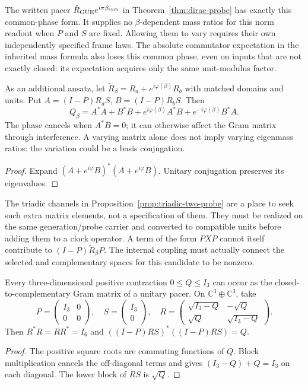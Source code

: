 The written pacer $\hat R_{\rm GUE}e^{i\pi\beta_{\mathrm{sym}}}$ in
Theorem~\ref{thm:dirac-probe} has exactly this common-phase form.
It supplies no $\beta$-dependent mass ratios for this norm readout
when $P$ and $S$ are fixed. Allowing them to vary requires their
own independently specified frame laws.
The absolute commutator expectation in the inherited mass formula
also loses this common phase, even on inputs that are not exactly
closed: its expectation acquires only the same unit-modulus factor.

\begin{proposition}
\label{v480:generation-relative-phase}
As an additional ansatz, let
$\widetilde R_\beta=R_a+e^{i\varphi(\beta)}R_b$ with matched
domains and units. Put $A=(I-P)R_aS$, $B=(I-P)R_bS$. Then
\[
 Q_\beta=A^*A+B^*B
       +e^{i\varphi(\beta)}A^*B
       +e^{-i\varphi(\beta)}B^*A.
\]
The phase cancels when $A^*B=0$; it can otherwise affect the Gram
matrix through interference. A varying matrix alone does not imply
varying eigenmass ratios: the variation could be a basis conjugation.
\end{proposition}
\begin{proof}
Expand $(A+e^{i\varphi}B)^*(A+e^{i\varphi}B)$.
Unitary conjugation preserves its eigenvalues.
\end{proof}

The triadic channels in Proposition~\ref{prop:triadic-two-probe}
are a place to seek such extra matrix elements, not a specification
of them. They must be realized on the same generation/probe carrier
and converted to compatible units before adding them to a clock
operator. A term of the form $PXP$ cannot itself contribute to
$(I-P)\widetilde R_\beta P$. The internal coupling must actually
connect the selected and complementary spaces for this candidate
to be nonzero.

\begin{proposition}
\label{v480:generation-unitary-dilation}
Every three-dimensional positive contraction $0\leq Q\leq I_3$
can occur as the closed-to-complementary Gram matrix of a unitary
pacer. On $\mathbb C^3\oplus\mathbb C^3$, take
\[
 P=\begin{pmatrix}I_3&0\\0&0\end{pmatrix},\quad
 S=\begin{pmatrix}I_3\\0\end{pmatrix},\quad
 R=\begin{pmatrix}\sqrt{I_3-Q}&-\sqrt Q\\
                   \sqrt Q&\sqrt{I_3-Q}\end{pmatrix}.
\]
Then $R^*R=RR^*=I_6$ and
$((I-P)RS)^*((I-P)RS)=Q$.
\end{proposition}
\begin{proof}
The positive square roots are commuting functions of $Q$.
Block multiplication cancels the off-diagonal terms and gives
$(I_3-Q)+Q=I_3$ on each diagonal. The lower block of $RS$
is $\sqrt Q$.
\end{proof}

